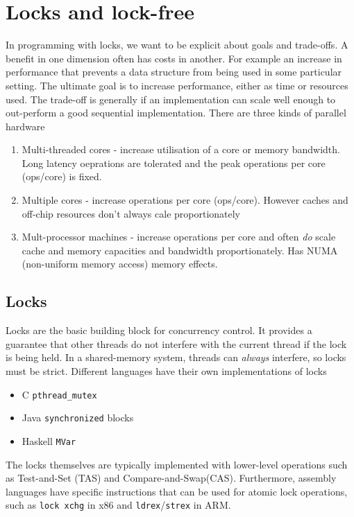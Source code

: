 \documentclass[CS4204-Notes.tex]{subfiles}
\begin{document}
\section{Locks and lock-free}
In programming with locks, we want to be explicit about goals and trade-offs. A benefit in one dimension often has costs in another. For example an increase in performance that prevents a data structure from being used in some particular setting. The ultimate goal is to increase performance, either as time or resources used. The trade-off is generally if an implementation can scale well enough to out-perform a good sequential implementation.
\n
There are three kinds of parallel hardware
\begin{enumerate}
\item Multi-threaded cores - increase utilisation of a core or memory bandwidth. Long latency oeprations are tolerated and the peak operations per core (ops/core) is fixed.
\item Multiple cores - increase operations per core (ops/core). However caches and off-chip resources don't always cale proportionately
\item Mult-processor machines - increase operations per core and often \textit{do} scale cache and memory capacities and bandwidth proportionately. Has NUMA (non-uniform memory access) memory effects.
\end{enumerate}

\subsection{Locks}
Locks are the basic building block for concurrency control. It provides a guarantee that other threads do not interfere with the current thread if the lock is being held. In a shared-memory system, threads can \textit{always} interfere, so locks must be strict. Different languages have their own implementations of locks
\begin{itemize}
\item C \texttt{pthread_mutex}
\item Java \texttt{synchronized} blocks
\item Haskell \texttt{MVar}
\end{itemize}
The locks themselves are typically implemented with lower-level operations such as Test-and-Set (TAS) and Compare-and-Swap(CAS). Furthermore, assembly languages have specific instructions that can be used for atomic lock operations, such as \texttt{lock xchg} in x86 and \texttt{ldrex}/\texttt{strex} in ARM.
\end{document}
